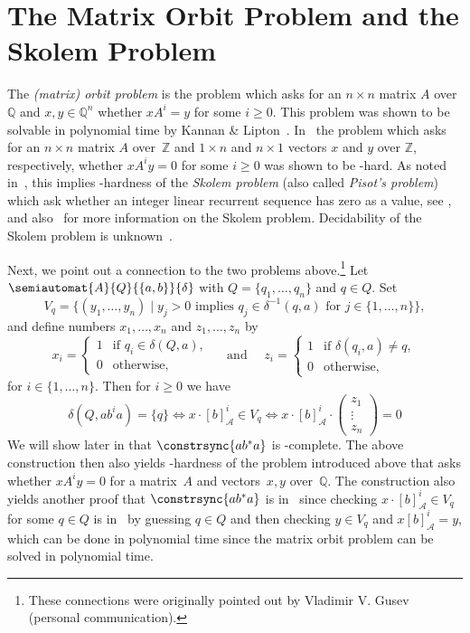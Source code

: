\section{The Matrix Orbit Problem and the Skolem Problem}
\label{constrsync:sec:motivation:skolem}

The \emph{(matrix) orbit problem} is the problem
which asks for an $n \times n$ matrix $A$ over $\mathbb Q$
and
$x,y \in \mathbb Q^n$ %
whether $xA^i = y$
for some $i \ge 0$. This problem was shown to be solvable
in polynomial time by Kannan \& Lipton~\cite{KannanLipton1986}.
In~\cite[Cor.~1.3]{BLONDEL2002}
the problem which asks for an $n \times n$ matrix $A$ over~$\mathbb Z$
and $1 \times n$ and $n \times 1$ vectors $x$ and $y$ over $\mathbb Z$, respectively, 
whether $xA^iy = 0$ for some $i \ge 0$ was shown to be \NP-hard.
As noted in~\cite{BLONDEL2002},
this implies \NP-hardness of the \emph{Skolem problem} (also called \emph{Pisot's problem})
which ask whether an integer linear recurrent sequence has zero as a value,
see \cite{BLONDEL2002}, and also~\cite{DBLP:conf/rp/OuaknineW12} for more information on the Skolem problem.
Decidability of the Skolem problem is unknown~\cite{DBLP:conf/rp/OuaknineW12}.

Next, we point out a connection
to the two problems above.\footnote{These connections were originally pointed out by Vladimir V. Gusev (personal communication).}
Let $\semiautomat{A}{Q}{\{a,b\}}{\delta}$ with $Q = \{q_1,\ldots,q_n\}$
and $q \in Q$.
Set
\[
V_q = \{ (y_1, \ldots, y_n) \mid y_j > 0 \text{ implies } q_j \in \delta^{-1}(q, a) \text{ for } j \in \{1,\ldots,n\} \},
\]
and define numbers $x_1, \ldots, x_n$ and $z_1, \ldots, z_n$
by 
\[
x_i = \begin{cases}
	1 & \text{if } q_i \in \delta(Q, a), \\
	0 & \text{otherwise,}
\end{cases}
\quad\text{ and }\quad
z_i = \begin{cases}
	1 & \text{if } \delta(q_i, a) \ne q, \\
	0 & \text{otherwise,}
\end{cases}
\]
for $i \in \{1,\ldots,n\}$. Then for $i \ge 0$ we have
\[
	\delta(Q, ab^ia) = \{q\}
	 \Leftrightarrow x \cdot [b]_{\mathcal A}^i \in V_q 
	 \Leftrightarrow  x \cdot [b]_{\mathcal A}^i \cdot \begin{pmatrix} z_1 \\ \vdots \\ z_n \end{pmatrix} = 0
\]
We will show later in 
that $\constrsync{ab^*a}$ is \NP-complete. The above construction
then also yields \NP-hardness of the problem introduced above
that asks whether $xA^iy = 0$ for a matrix~$A$ and vectors~$x,y$ over~$\mathbb Q$.
The construction also yields another proof
that $\constrsync{ab^*a}$ is in \NP\  since checking $x \cdot [b]_{\mathcal A}^i \in V_q$ for some $q \in Q$
is in \NP\  by guessing $q \in Q$ and then checking $y \in V_q$ and $x[b]^i_{\mathcal A} = y$,
which can be done in polynomial time since the matrix orbit problem 
can be solved in polynomial time.
 
